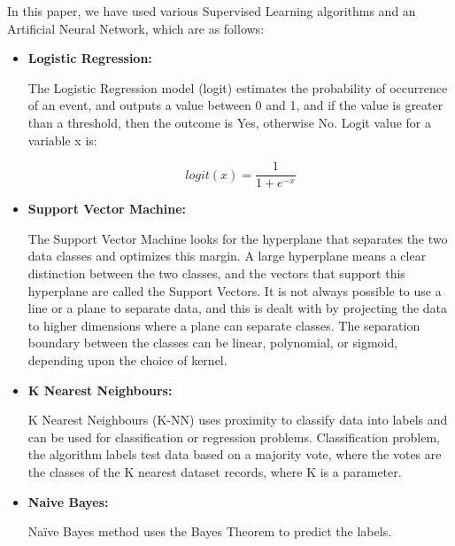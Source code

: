 In this paper, we have used various Supervised Learning algorithms and an Artificial Neural Network, which are as follows:

\begin{itemize}

\item \textbf{Logistic Regression:}

The Logistic Regression model (logit) estimates the probability of occurrence of an event, and outputs a value between 0 and 1, and if the value is greater than a threshold, then the outcome is Yes, otherwise No. Logit value for a variable x is:

 \begin{equation}
    logit(x)= \frac  {1}   {1+e^{-x}}
  \end{equation}

\item \textbf{Support Vector Machine:}

The Support Vector Machine looks for the hyperplane that separates the two data classes and optimizes this margin. A large hyperplane means a clear distinction between the two classes, and the vectors that support this hyperplane are called the Support Vectors. It is not always possible to use a line or a plane to separate data, and this is dealt with by projecting the data to higher dimensions where a plane can separate classes. The separation boundary between the classes can be linear, polynomial, or sigmoid, depending upon the choice of kernel.


\item \textbf{K Nearest Neighbours:}

K Nearest Neighbours (K-NN) uses proximity to classify data into labels and can be used for classification or regression problems. Classification problem, the algorithm labels test data based on a majority vote, where the votes are the classes of the K nearest dataset records, where K is a parameter. 


\item \textbf{Naive Bayes:}

Naïve Bayes method uses the Bayes Theorem to predict the labels.  




\end{itemize}
